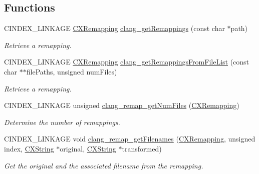 \subsection*{Functions}
\begin{DoxyCompactItemize}
\item 
C\+I\+N\+D\+E\+X\+\_\+\+L\+I\+N\+K\+A\+GE \mbox{\hyperlink{group__CINDEX__REMAPPING_ga04be0aca9e36a130cf1dd6fd8cbd4408}{C\+X\+Remapping}} \mbox{\hyperlink{group__CINDEX__REMAPPING_ga6388687c77b68fb0e83a393a91625c7f}{clang\+\_\+get\+Remappings}} (const char $\ast$path)
\begin{DoxyCompactList}\small\item\em Retrieve a remapping. \end{DoxyCompactList}\item 
C\+I\+N\+D\+E\+X\+\_\+\+L\+I\+N\+K\+A\+GE \mbox{\hyperlink{group__CINDEX__REMAPPING_ga04be0aca9e36a130cf1dd6fd8cbd4408}{C\+X\+Remapping}} \mbox{\hyperlink{group__CINDEX__REMAPPING_gadc19460a19f4f0d3ab8b722dca75b047}{clang\+\_\+get\+Remappings\+From\+File\+List}} (const char $\ast$$\ast$file\+Paths, unsigned num\+Files)
\begin{DoxyCompactList}\small\item\em Retrieve a remapping. \end{DoxyCompactList}\item 
\mbox{\label{group__CINDEX__REMAPPING_ga17c7dd265fa861d2f7e67223eaae653d}} 
C\+I\+N\+D\+E\+X\+\_\+\+L\+I\+N\+K\+A\+GE unsigned \mbox{\hyperlink{group__CINDEX__REMAPPING_ga17c7dd265fa861d2f7e67223eaae653d}{clang\+\_\+remap\+\_\+get\+Num\+Files}} (\mbox{\hyperlink{group__CINDEX__REMAPPING_ga04be0aca9e36a130cf1dd6fd8cbd4408}{C\+X\+Remapping}})
\begin{DoxyCompactList}\small\item\em Determine the number of remappings. \end{DoxyCompactList}\item 
C\+I\+N\+D\+E\+X\+\_\+\+L\+I\+N\+K\+A\+GE void \mbox{\hyperlink{group__CINDEX__REMAPPING_ga22fa206f0879f988bac281390063a9d7}{clang\+\_\+remap\+\_\+get\+Filenames}} (\mbox{\hyperlink{group__CINDEX__REMAPPING_ga04be0aca9e36a130cf1dd6fd8cbd4408}{C\+X\+Remapping}}, unsigned index, \mbox{\hyperlink{structCXString}{C\+X\+String}} $\ast$original, \mbox{\hyperlink{structCXString}{C\+X\+String}} $\ast$transformed)
\begin{DoxyCompactList}\small\item\em Get the original and the associated filename from the remapping. \end{DoxyCompactList}\item 
$$
\end{DoxyCompactItemize}
